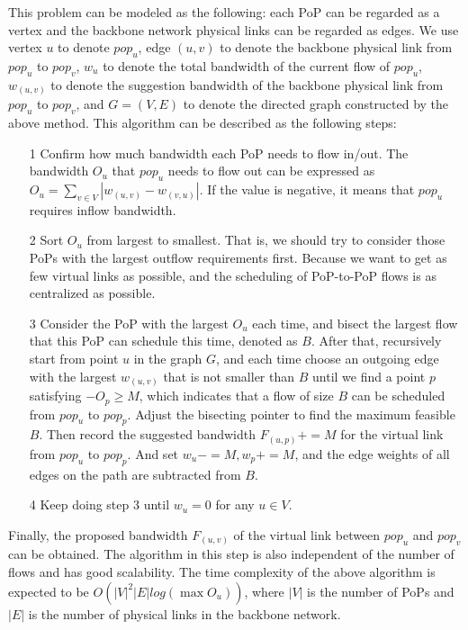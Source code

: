 {This problem can be modeled as the following: each PoP can be regarded as a vertex and the backbone network physical links can be regarded as edges. We use vertex $u$ to denote $pop_u$, edge $(u,v)$ to denote the backbone physical link from $pop_u$ to $pop_v$, $w_u$ to denote the total bandwidth of the current flow of $pop_u$, $w_{(u,v)}$ to denote the suggestion bandwidth of the backbone physical link from $pop_u$ to $pop_v$, and $G=(V, E)$ to denote the directed graph constructed by the above method. This algorithm can be described as the following steps:}

\begin{itemize}[leftmargin=*] 
\item[1] Confirm how much bandwidth each PoP needs to flow in/out. The bandwidth $O_u$ that $pop_u$ needs to flow out can be expressed as $O_u=\sum_{v\in V} |w_{(u,v)}-w_{(v,u)}| $. If the value is negative, it means that $pop_u$ requires inflow bandwidth.
\item[2] Sort $O_u$ from largest to smallest. That is, we should try to consider those PoPs with the largest outflow requirements first. Because we want to get as few virtual links as possible, and the scheduling of PoP-to-PoP flows is as centralized as possible.
\item[3] Consider the PoP with the largest $O_u$ each time, and bisect the largest flow that this PoP can schedule this time, denoted as $B$. After that, recursively start from point $u$ in the graph $G$, and each time choose an outgoing edge with the largest $w_{(u,v)}$ that is not smaller than $B$ until we find a point $p$ satisfying $-O_p\ge M$, which indicates that a flow of size $B$ can be scheduled from $pop_u$ to $pop_p$. Adjust the bisecting pointer to find the maximum feasible $B$. Then record the suggested bandwidth $F_{(u,p)}+=M$ for the virtual link from $pop_u$ to $pop_p$. And set $w_u-=M,w_p+=M$, and the edge weights of all edges on the path are subtracted from $B$.
\item[4] Keep doing step 3 until $w_u=0$ for any $u\in V$.
\end{itemize}

{Finally, the proposed bandwidth $F_{(u,v)}$ of the virtual link between $pop_u$ and $pop_v$ can be obtained. The algorithm in this step is also independent of the number of flows and has good scalability. The time complexity of the above algorithm is expected to be $O(|V|^2 |E| log(\max O_u))$, where $|V|$ is the number of PoPs and $|E|$ is the number of physical links in the backbone network.}


